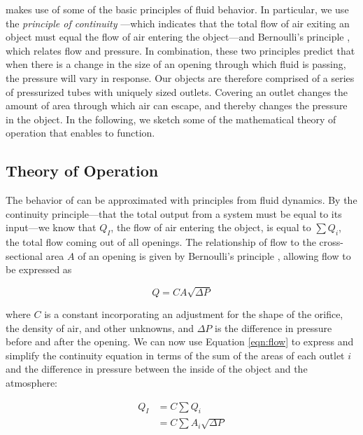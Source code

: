 			\at makes use of some of the basic principles of fluid behavior. In
			particular, we use the \textit{principle of continuity}
			\cite{Rieutord:2015iw}---which indicates that the total flow of air exiting
			an object must equal the flow of air entering the object---and Bernoulli's
			principle \cite{bernoulli1738hydrodynamica}, which relates flow and
			pressure. In combination, these two principles predict that when there is a
			change in the size of an opening through which fluid is passing, the
			pressure will vary in response. Our objects are therefore comprised of a
			series of pressurized tubes with uniquely sized outlets. Covering an outlet
			changes the amount of area through which air can escape, and thereby changes
			the pressure in the object. In the following, we sketch some of the
			mathematical theory of operation that enables \at to function.

			\subsection{Theory of Operation}
				The behavior of \at can be approximated with principles from fluid
				dynamics. By the continuity principle---that the total output from a
				system must be equal to its input---we know that $Q_I$, the flow of air
				entering the object, is equal to $\sum Q_i$, the total flow coming out of
				all openings. The relationship of flow to the cross-sectional area $A$ of
				an opening is given by Bernoulli's principle \cite{Rieutord:2015iw},
				allowing flow to be expressed as

				\begin{equation}
					Q = CA\sqrt{\Delta P}
					\label{eqn:flow}
				\end{equation}

				where $C$ is a constant incorporating an adjustment for the shape of the
				orifice, the density of air, and other unknowns, and $\Delta P$ is the
				difference in pressure before and after the opening. We can now use
				Equation \ref{eqn:flow} to express and simplify the continuity equation in terms
				of the sum of the areas of each outlet $i$ and the difference in pressure
				between the inside of the object and the atmosphere:

				\begin{align}
					Q_I &= C\sum Q_i \nonumber \\
							&= C\sum A_i \sqrt{\Delta P}
							\label{eqn:flow-per-outlet}
				\end{align}

